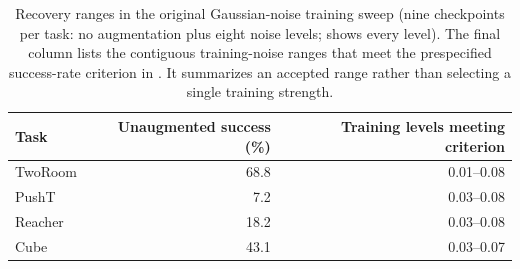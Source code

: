 \begin{table}[H]
\centering
\caption{Recovery ranges in the original Gaussian-noise training sweep
(nine checkpoints per task: no augmentation plus eight noise levels;
 shows every level). The final column lists
the contiguous training-noise ranges that meet the prespecified success-rate
criterion in . It summarizes an accepted range rather than
selecting a single training strength.}
\label{tab:full-sweep-compact}
\footnotesize
\setlength{\tabcolsep}{7pt}
\begin{tabular}{lrr}
\toprule
Task & Unaugmented success (\%) & Training levels meeting criterion \\
\midrule
TwoRoom & 68.8 & 0.01--0.08 \\
PushT & 7.2 & 0.03--0.08 \\
Reacher & 18.2 & 0.03--0.08 \\
Cube & 43.1 & 0.03--0.07 \\
\bottomrule
\end{tabular}
\end{table}
